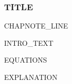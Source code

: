 %
%

\begin{frame}
  \frametitle{{{TITLE}}}
  {{CHAPNOTE_LINE}}
  \vskip0.1cm

  {{INTRO_TEXT}}

  \vskip0.1cm
  {{EQUATIONS}}
  \vskip0.1cm

  {{EXPLANATION}}
\end{frame}

%
%
